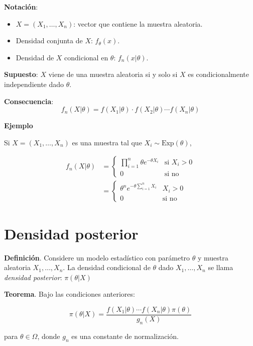\documentclass[
  12pt,
]{book}
\begin{document}
\textbf{Notación}:

\begin{itemize}
\item
  \(X = (X_1,\dots, X_n)\): vector que contiene la muestra aleatoria.
\item
  Densidad conjunta de \(X\): \(f_\theta(x)\).
\item
  Densidad de \(X\) condicional en \(\theta\): \(f_n(x|\theta)\).
\end{itemize}

\textbf{Supuesto}: \(X\) viene de una muestra aleatoria si y solo si \(X\) es condicionalmente independiente dado \(\theta\).

\textbf{Consecuencia}: \[f_n(X|\theta) = f(X_1|\theta)\cdot f(X_2|\theta)\cdots f(X_n|\theta)\]

\textbf{Ejemplo}

Si \(X = (X_1,\dots, X_n)\) es una muestra tal que \(X_i\sim \text{Exp}(\theta)\),

\begin{align*}
f_n(X|\theta) &= \begin{cases}\prod_{i=1}^n \theta e^{-\theta X_i} & \text{si } X_i>0\\
0 & \text{si no}
\end{cases}  \\
&= \begin{cases}\theta^n e^{-\theta\sum_{i=1}^n X_i} & X_i > 0  \\ 0 & \text{si no}\end{cases}
\end{align*}

\hypertarget{densidad-posterior}{%
\section{Densidad posterior}\label{densidad-posterior}}

\textbf{Definición}. Considere un modelo estadístico con parámetro \(\theta\) y muestra
aleatoria \(X_1,\dots, X_n\). La densidad condicional de \(\theta\) dado
\(X_1,\dots,X_n\) se llama \emph{densidad posterior}: \(\pi(\theta|X)\)

\textbf{Teorema}. Bajo las condiciones anteriores:

\begin{equation*}
\pi(\theta|X) =
\dfrac{f(X_1|\theta)\cdots f(X_n|\theta)\pi(\theta)}{g_n(X)} 
\end{equation*}

para \(\theta \in \Omega\), donde \(g_n\) es una constante de
normalización.
\end{document}
